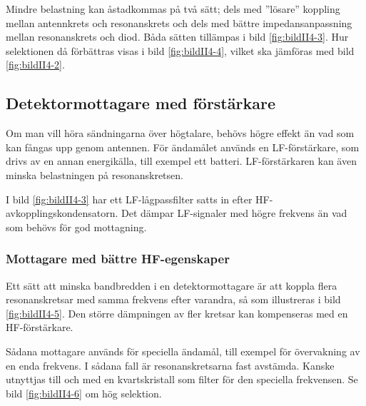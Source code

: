 Mindre belastning kan åstadkommas på två sätt; dels med ''lösare''
koppling mellan antennkrets och resonanskrets och dels med bättre
impedansanpassning mellan resonanskrets och diod. Båda sätten
tillämpas i bild \ref{fig:bildII4-3}. Hur selektionen då förbättras visas i
bild \ref{fig:bildII4-4}, vilket ska jämföras med bild \ref{fig:bildII4-2}.



\subsection{Detektormottagare med förstärkare}

Om man vill höra sändningarna över högtalare, behövs högre effekt än
vad som kan fångas upp genom antennen.
För ändamålet används en LF-förstärkare, som drivs av en annan energikälla,
till exempel ett batteri.
LF-förstärkaren kan även minska belastningen på resonanskretsen.

I bild \ref{fig:bildII4-3} har ett LF-lågpassfilter satts in efter
HF-avkopplingskondensatorn.
Det dämpar LF-signaler med högre frekvens än vad som behövs för god mottagning.

\subsubsection{Mottagare med bättre HF-egenskaper}

Ett sätt att minska bandbredden i en detektormottagare är att koppla
flera resonanskretsar med samma frekvens efter varandra, så som illustreras
i bild \ref{fig:bildII4-5}.
Den större dämpningen av fler kretsar kan kompenseras med en HF-förstärkare.

Sådana mottagare används för speciella ändamål, till exempel för övervakning
av en enda frekvens.
I sådana fall är resonanskretsarna fast avstämda.
Kanske utnyttjas till och med en kvartskristall som filter för den speciella
frekvensen.
Se bild \ref{fig:bildII4-6} om hög selektion.




